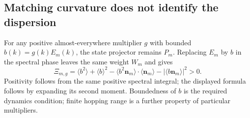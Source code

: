 \documentclass[11pt]{article}
\theoremstyle{definition}
\begin{document}
\subsection{Matching curvature does not identify the dispersion}

For any positive almost-everywhere multiplier $g$ with bounded
$b(k)=g(k)E_m(k)$, the state projector remains $P_m$. Replacing $E_m$ by $b$
in the spectral phase leaves the same weight $W_m$ and gives
\begin{equation}
 \Xi_{m,g}=\langle b^2\rangle+\langle b\rangle^2
  -\langle b^2\boldsymbol n_m\rangle\cdot\langle\boldsymbol n_m\rangle
  -|\langle b\boldsymbol n_m\rangle|^2>0.
 \label{eq:neutral-general-multiplier}
\end{equation}
Positivity follows from the same positive spectral integral; the displayed
formula follows by expanding its second moment. Boundedness of $b$ is the
required dynamics condition; finite hopping range is a further property of
particular multipliers.
\end{document}
